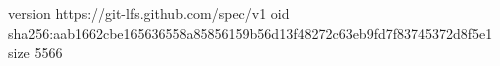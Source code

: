 version https://git-lfs.github.com/spec/v1
oid sha256:aab1662cbe165636558a85856159b56d13f48272c63eb9fd7f83745372d8f5e1
size 5566
